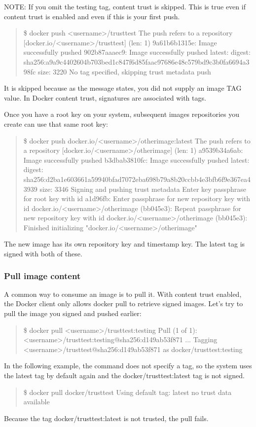 NOTE: If you omit the testing tag, content trust is skipped. This is true
even if content trust is enabled and even if this is your first push.
\begin{quote}
\$ docker push <username>/trusttest
The push refers to a repository [docker.io/<username>/trusttest] (len: 1)
9a61b6b1315e: Image successfully pushed
902b87aaaec9: Image successfully pushed
latest: digest:
sha256:a9a9c4402604b703bed1c847f6d85faac97686e48c579bd9c3b0fa6694a398fc
size: 3220
No tag specified, skipping trust metadata push
\end{quote}

It is skipped because as the message states, you did not supply an image
TAG value. In Docker content trust, signatures are associated with tags.

Once you have a root key on your system, subsequent images repositories you
create can use that same root key:

\begin{quote}
\$ docker push docker.io/<username>/otherimage:latest
The push refers to a repository [docker.io/<username>/otherimage] (len: 1)
a9539b34a6ab: Image successfully pushed
b3dbab3810fc: Image successfully pushed
latest: digest:
sha256:d2ba1e603661a59940bfad7072eba698b79a8b20ccbb4e3bfb6f9e367ea43939
size: 3346
Signing and pushing trust metadata
Enter key passphrase for root key with id a1d96fb:
Enter passphrase for new repository key with id
docker.io/<username>/otherimage (bb045e3):
Repeat passphrase for new repository key with id
docker.io/<username>/otherimage (bb045e3):
Finished initializing "docker.io/<username>/otherimage"
\end{quote}

The new image has its own repository key and timestamp key. The latest tag
is signed with both of these.

\subsubsection{Pull image content}
A common way to consume an image is to pull it. With content trust enabled,
the Docker client only allows docker pull to retrieve signed images. Let’s
try to pull the image you signed and pushed earlier:

\begin{quote}
\$  docker pull <username>/trusttest:testing
Pull (1 of 1): <username>/trusttest:testing@sha256:d149ab53f871
...
Tagging <username>/trusttest@sha256:d149ab53f871 as
docker/trusttest:testing
\end{quote}

In the following example, the command does not specify a tag, so the system
uses the latest tag by default again and the docker/trusttest:latest tag is
not signed.

\begin{quote}
\$ docker pull docker/trusttest
Using default tag: latest
no trust data available
\end{quote}

Because the tag docker/trusttest:latest is not trusted, the pull fails.

